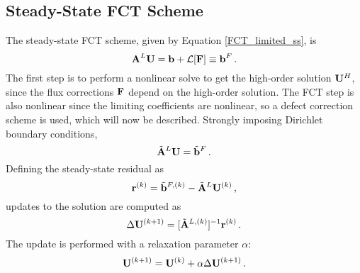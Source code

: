 \subsection{Steady-State FCT Scheme}
The steady-state FCT scheme, given by Equation \eqref{FCT_limited_ss}, is
\begin{equation}
   \mathbf{A}^L\mathbf{U} = \mathbf{b} + \mathcal{L}[\mathbf{F}] \equiv \mathbf{b}^F \,.
\end{equation}
The first step is to perform a nonlinear solve to get the high-order
solution $\mathbf{U}^H$, since the flux corrections $\mathbf{F}$ depend on the high-order
solution. The FCT step is also nonlinear since the limiting coefficients
are nonlinear, so a defect correction scheme is used, which will
now be described.
Strongly imposing Dirichlet boundary conditions,
\begin{equation}
   \tilde{\mathbf{A}}^L\mathbf{U} = \tilde{\mathbf{b}}^F \,.
\end{equation}
Defining the steady-state residual as
\begin{equation}
   \mathbf{r}^{(k)} = \tilde{\mathbf{b}}^{F,(k)} - \tilde{\mathbf{A}}^{L}\mathbf{U}^{(k)} \,,
\end{equation}
updates to the solution are computed as
\begin{equation}
   \Delta\mathbf{U}^{(k+1)} = [\tilde{\mathbf{A}}^{L,(k)}]^{-1}\mathbf{r}^{(k)} \,.
\end{equation}
The update is performed with a relaxation parameter $\alpha$:
\begin{equation}
   \mathbf{U}^{(k+1)} = \mathbf{U}^{(k)} + \alpha\Delta\mathbf{U}^{(k+1)} \,.
\end{equation}


